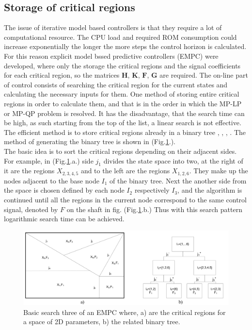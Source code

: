 \subsection{Storage of critical regions}\label{BASICCSR:sec:EMPCStorage}

The issue of iterative model based controllers is that they require a lot of computational resource. The CPU load and required ROM consumption could increase exponentially the longer the more steps the control horizon is calculated. For this reason explicit model bssed predictive controllers (EMPC) were developed, where only the storage the critical regions and the signal coefficients for each critical region, so the matrices $\textbf{H}$, $\textbf{K}$, $\textbf{F}$, $\textbf{G}$ are required. The on-line part of control consists of searching the critical region for the current states and calculating the necessary inputs for them.
One method of storing entire critical regions in order to calculate them, and that is in the order in which the MP-LP or MP-QP problem is resolved. It has the disadvantage, that the search time can be high, as such starting from the top of the list, a linear search is not effective. The efficient method is to store critical regions already in a binary tree \cite{jones2006logarithmic}, \cite{tondel2003evaluation}, \cite{tondel2003constrained}, \cite{kutasi2008vector}. The method of generating the binary tree is shown in (Fig.\ref{BASICMPC:fig:searchtree}.).\\
 The basic idea is to sort the critical regions depending on their adjacent sides. For example, in (Fig.\ref{BASICMPC:fig:searchtree}.a.) side $j_1$ divides the state space into two, at the right of it are the regions $X_{2,3,4,5}$ and to the left are the regions $X_{1,2,6}$. They make up the nodes adjacent to the base node $I_1$ of the binary tree. Next the another side from the space is chosen defined by each node $I_2$ respectively $I_3$, and the algorithm is continued until all the regions in the current node correspond to the same control signal, denoted by $F$ on the shaft in fig. (Fig.\ref{BASICMPC:fig:searchtree}.b.) Thus with this search pattern logarithmic search time can be achieved.

 \begin{figure}[!ht]
        \centering
        \includegraphics[width=\textwidth]{EMPC_PNG_Pics/BasicSearchTree.png}
        \caption{Basic search three of an EMPC where, a) are the critical regions for a space of 2D parameters,
b) the related binary tree.}
        \label{BASICMPC:fig:searchtree}
    \end{figure}

